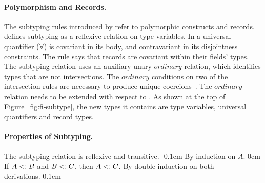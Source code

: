 
\paragraph{Polymorphism and Records.}
The subtyping rules introduced by \name refer to polymorphic constructs and records. 
 defines subtyping as a reflexive relation on type variables.
In  a universal quantifier ($\forall$) 
is covariant in its body, and contravariant in its disjointness constraints.
The  rule says that records are covariant
within their fields' types.
The subtyping relation uses an auxiliary unary $ordinary$ relation,
which identifies types that are not intersections. The $ordinary$ conditions on two of the intersection rules are necessary to 
produce unique coercions~\cite{oliveira16disjoint}. The $ordinary$
relation needs to be extended with respect to \oldname.
As shown at the top of Figure~\ref{fig:fi-subtype}, the new types it contains are 
type variables, universal quantifiers and record types.

\paragraph{Properties of Subtyping.} The subtyping relation is reflexive and transitive.
{-0.1cm}
{By induction on $A$.}
{0cm}
{If $A <: B$ and $B <: C$, then $A <: C$.}
{By double induction on both derivations.}{-0.1cm}

